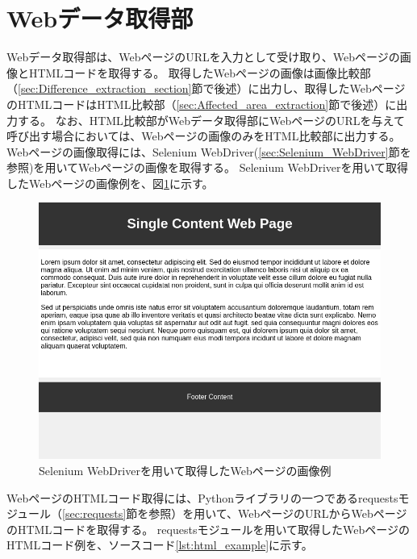 \section{Webデータ取得部}\label{sec:Web_data_get_section}
Webデータ取得部は、WebページのURLを入力として受け取り、Webページの画像とHTMLコードを取得する。
取得したWebページの画像は画像比較部（\ref{sec:Difference_extraction_section}節で後述）に出力し、取得したWebページのHTMLコードはHTML比較部（\ref{sec:Affected_area_extraction}節で後述）に出力する。
なお、HTML比較部がWebデータ取得部にWebページのURLを与えて呼び出す場合においては、Webページの画像のみをHTML比較部に出力する。
Webページの画像取得には、Selenium WebDriver(\ref{sec:Selenium_WebDriver}節を参照)を用いてWebページの画像を取得する。
Selenium WebDriverを用いて取得したWebページの画像例を、図\ref{fig:4_get_images}に示す。
\begin{figure}[tp]
    \begin{center}
        \includegraphics[width=1.0\columnwidth]{image/4_get_images.png}
        \caption{Selenium WebDriverを用いて取得したWebページの画像例}
        \label{fig:4_get_images}
    \end{center}
\end{figure}
WebページのHTMLコード取得には、Pythonライブラリの一つであるrequestsモジュール（\ref{sec:requests}節を参照）を用いて、WebページのURLからWebページのHTMLコードを取得する。
requestsモジュールを用いて取得したWebページのHTMLコード例を、ソースコード\ref{lst:html_example}に示す。
